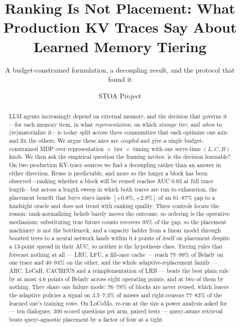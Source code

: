 \documentclass[sigconf, nonacm]{acmart}
\begin{document}
\title{Ranking Is Not Placement: What Production KV Traces Say About Learned Memory Tiering}
\subtitle{A budget-constrained formulation, a decoupling result, and the protocol that found it}

\author{STOA Project}

\begin{abstract}
LLM agents increasingly depend on external memory, and the decision that governs it---for each memory
item, in what \emph{representation}, on which \emph{storage tier}, and \emph{when} to (re)materialize
it---is today split across three communities that each optimize one axis and fix the others. We argue
these axes are \emph{coupled} and give a single budget-constrained MDP over
representation~$\times$~tier~$\times$~timing with one serve-time $(L,C,B)$ knob. We then ask the
empirical question the framing invites: is the decision learnable? On two production KV-trace sources we
find a decoupling rather than an answer in either direction. Reuse is predictable, and more so the longer a
block has been observed---ranking whether a block will be reused reaches AUC 0.93 at full trace
length---but across a length sweep in which both traces are run to exhaustion, the placement benefit that buys stays inside
$[+0.8\%, +2.9\%]$ of an 81--87\% gap to a hindsight oracle and does not trend with ranking quality. Three
controls locate the reason: rank-normalizing beliefs barely moves the outcome, so ordering is the
operative mechanism; substituting true future counts recovers 95\% of the gap, so the placement
machinery is not the bottleneck; and a capacity ladder from a linear model through boosted trees to a
neural network lands within 0.4 points of itself on placement despite a 13-point spread in their AUC, so
neither is the hypothesis class. Tiering rules that forecast nothing at all --- LRU, LFU, a fill-once cache --- reach 75--99\% of Belady
on one trace and 40--94\% on the other, and the whole adaptive-replacement family --- ARC, LeCaR, CACHEUS
and a reimplementation of LRB --- beats the best plain rule by at most 4.6 points of Belady across eight
operating points, and at two of them by nothing. They share one failure mode: 76--78\% of blocks are
never reused, which leaves the adaptive policies a signal on 3.5--7.3\% of misses and right-censors
77--83\% of the learned one's training rows. On LoCoMo, re-run at the size a power analysis asked for --- ten dialogues, 300 scored questions per
arm, paired tests --- query-aware retrieval beats query-agnostic placement by a factor of four at a tight

\end{abstract}
\end{document}
